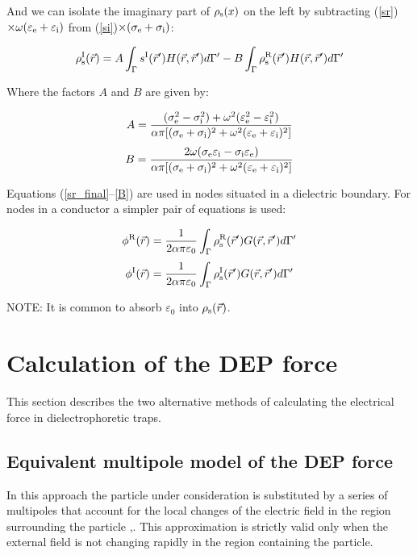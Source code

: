 \documentclass[12pt]{report}
\begin{document}
And we can isolate the imaginary part of $\rho_{\rm s}(x)$ on the left by subtracting (\ref{sr})$\times\omega(\varepsilon_{\rm e}+\varepsilon_{\rm i})$ from (\ref{si})$\times(\sigma_{\rm e}+\sigma_{\rm i})$:

\begin{equation}\rho_{\rm s}^{\rm I}(\vec{r})=A\int_\Gamma{s^{\rm I}(\vec{r}^\prime)H(\vec{r},\vec{r}^\prime)d\Gamma^\prime}-B\int_\Gamma{\rho_{\rm s}^{\rm R}(\vec{r}^\prime)H(\vec{r},\vec{r}^\prime)d\Gamma^\prime}\label{si_final}\end{equation}

Where the factors $A$ and $B$ are given by:

\begin{equation}A=\frac{(\sigma^2_{\rm e}-\sigma^2_{\rm i})+\omega^2(\varepsilon^2_{\rm e}-\varepsilon^2_{\rm i})}{\alpha\pi[(\sigma_{\rm e}+\sigma_{\rm i})^2+\omega^2(\varepsilon_{\rm e}+\varepsilon_{\rm i})^2]}\label{A}\end{equation}
\begin{equation}B=\frac{2\omega(\sigma_{\rm e}\varepsilon_{\rm i}-\sigma_{\rm i}\varepsilon_{\rm e})}{\alpha\pi[(\sigma_{\rm e}+\sigma_{\rm i})^2+\omega^2(\varepsilon_{\rm e}+\varepsilon_{\rm i})^2]}\label{B}\end{equation}

Equations (\ref{sr_final}--\ref{B}) are used in nodes situated in a dielectric boundary. For nodes in a conductor a simpler pair of equations is used:

\begin{equation}\phi^{\rm R}(\vec{r})=\frac{1}{2\alpha\pi\varepsilon_0}\int_\Gamma{\rho_{\rm s}^{\rm R}(\vec{r}^\prime)G(\vec{r},\vec{r}^\prime)d\Gamma^\prime}\end{equation}
\begin{equation}\phi^{\rm I}(\vec{r})=\frac{1}{2\alpha\pi\varepsilon_0}\int_\Gamma{\rho_{\rm s}^{\rm I}(\vec{r}^\prime)G(\vec{r},\vec{r}^\prime)d\Gamma^\prime}\end{equation}

NOTE: It is common to absorb $\varepsilon_0$ into $\rho_{\rm s}(\vec{r})$.

\section{Calculation of the DEP force}
This section describes the two alternative methods of calculating the electrical force in dielectrophoretic traps.

\subsection{Equivalent multipole model of the DEP force}
In this approach the particle under consideration is substituted by a series of multipoles that account for the local changes of the electric field in the region surrounding the particle \cite{Washizu1994},\cite{Jones1996}. This approximation is strictly valid only when the external field is not changing rapidly in the region containing the particle. 
\end{document}
